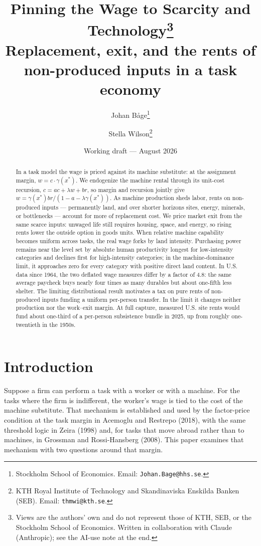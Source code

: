 \documentclass[12pt]{article}
\title{\bfseries Pinning the Wage to Scarcity and Technology\thanks{Views are the
  authors' own and do not represent those of KTH, SEB, or the Stockholm School of
  Economics. Written in collaboration with Claude (Anthropic); see the AI-use note
  at the end.
  }\\[7pt]
  \large\mdseries Replacement, exit, and the rents of non-produced inputs in a task economy}
\author{
  Johan B\r{a}ge\thanks{Stockholm School of Economics.
    Email: \texttt{Johan.Bage@hhs.se}.
  }
  \and
  Stella Wilson\thanks{KTH Royal Institute of Technology and Skandinaviska
    Enskilda Banken (SEB). Email: \texttt{thmwi@kth.se}.}
}
\date{Working draft --- August 2026}
\theoremstyle{plain}
\begin{document}
\maketitle

\begin{abstract}
\noindent In a task model the wage is priced against its machine substitute: at the assignment margin, $w=c\cdot\gamma(x^*)$. We endogenize the machine rental through its unit-cost recursion, $c=ac+\lambda w+br$, so margin and recursion jointly give $w=\gamma(x^*)br/(1-a-\lambda\gamma(x^*))$. As machine production sheds labor, rents on non-produced inputs --- permanently land, and over shorter horizons sites, energy, minerals, or bottlenecks --- account for more of replacement cost. We price market exit from the same scarce inputs: unwaged life still requires housing, space, and energy, so rising rents lower the outside option in goods units. When relative machine capability becomes uniform across tasks, the real wage forks by land intensity. Purchasing power remains near the level set by absolute human productivity longest for low-intensity categories and declines first for high-intensity categories; in the machine-dominance limit, it approaches zero for every category with positive direct land content. In U.S. data since 1964, the two deflated wage measures differ by a factor of 4.8: the same average paycheck buys nearly four times as many durables but about one-fifth less shelter. The limiting distributional result motivates a tax on pure rents of non-produced inputs funding a uniform per-person transfer. In the limit it changes neither production nor the work--exit margin. At full capture, measured U.S. site rents would fund about one-third of a per-person subsistence bundle in 2025, up from roughly one-twentieth in the 1950s.
\end{abstract}

\section{Introduction}\label{sec:intro}

Suppose a firm can perform a task with a worker or with a machine. For the tasks where the firm is indifferent, the worker's wage is tied to the cost of the machine substitute. That mechanism is established and used by the factor-price condition at the task margin in Acemoglu and Restrepo (2018), with the same threshold logic in Zeira (1998) and, for tasks that move abroad rather than to machines, in Grossman and Rossi-Hansberg (2008). This paper examines that mechanism with two questions around that margin.
\end{document}
